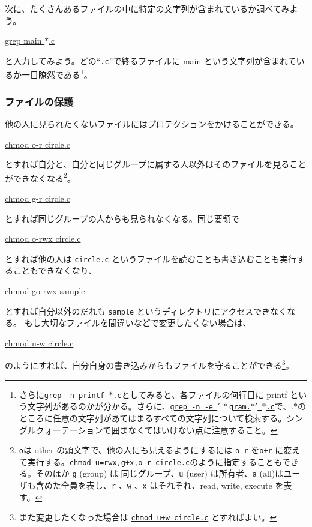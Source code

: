 次に、たくさんあるファイルの中に特定の文字列が含まれているか調べてみよう。
\begin{commandline2}
    \prompt \underline{grep main \(\ast\).c}
\end{commandline2} \noindent
と入力してみよう。どの``\texttt{.c}''で終るファイルに main という文字列が含まれているか一目瞭然である\footnote{さらに\texttt{\underline{grep -n printf \(\ast\).c}}としてみると、各ファイルの何行目に printf という文字列があるのかが分かる。さらに、\texttt{\underline{grep -n -e \('.\ast\)gram.\(\ast'\) \(\ast\).c}}で、.\(\ast\)のところに任意の文字列があてはまるすべての文字列について検索する。シングルクォーテーションで囲まなくてはいけない点に注意すること。}。

\subsubsection*{ファイルの保護}
他の人に見られたくないファイルにはプロテクションをかけることができる。
\begin{commandline2}
    \prompt \underline{chmod o-r circle.c}
\end{commandline2} \noindent
とすれば自分と、自分と同じグループに属する人以外はそのファイルを見ることができなくなる\footnote{\texttt{o}は other の頭文字で、他の人にも見えるようにするには \underline{\texttt{o-r}} を\underline{\texttt{o+r}} に変えて実行する。\underline{\texttt{chmod u=rwx,g+x,o-r circle.c}}のように指定することもできる。そのほか \texttt{g} (group) は 同じグループ、\texttt{u} (user) は所有者、\texttt{a} (all)はユーザも含めた全員を表し、\texttt{r} 、\texttt{w} 、\texttt{x} はそれぞれ、read, write, execute を表す。}。
\begin{commandline2}
    \prompt \underline{chmod g-r circle.c}
\end{commandline2} \noindent
とすれば同じグループの人からも見られなくなる。同じ要領で
\begin{commandline2}
    \prompt \underline{chmod o-rwx circle.c}
\end{commandline2} \noindent
とすれば他の人は \texttt{circle.c} というファイルを読むことも書き込むことも実行することもできなくなり、
\begin{commandline2}
    \prompt \underline{chmod go-rwx sample}
\end{commandline2} \noindent
とすれば自分以外のだれも \texttt{sample} というディレクトリにアクセスできなくなる。
もし大切なファイルを間違いなどで変更したくない場合は、
\begin{commandline2}
    \prompt \underline{chmod u-w circle.c}
\end{commandline2} \noindent
のようにすれば、自分自身の書き込みからもファイルを守ることができる\footnote{また変更したくなった場合は \underline{\texttt{chmod u+w circle.c}} とすればよい。}。

